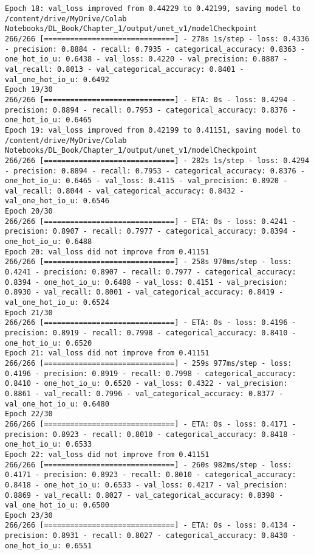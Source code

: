 \documentclass[
  letterpaper,
  DIV=11,
  numbers=noendperiod]{scrreprt}
\begin{document}
\begin{verbatim}
Epoch 18: val_loss improved from 0.44229 to 0.42199, saving model to /content/drive/MyDrive/Colab Notebooks/DL_Book/Chapter_1/output/unet_v1/modelCheckpoint
266/266 [==============================] - 278s 1s/step - loss: 0.4336 - precision: 0.8884 - recall: 0.7935 - categorical_accuracy: 0.8363 - one_hot_io_u: 0.6438 - val_loss: 0.4220 - val_precision: 0.8887 - val_recall: 0.8013 - val_categorical_accuracy: 0.8401 - val_one_hot_io_u: 0.6492
Epoch 19/30
266/266 [==============================] - ETA: 0s - loss: 0.4294 - precision: 0.8894 - recall: 0.7953 - categorical_accuracy: 0.8376 - one_hot_io_u: 0.6465
Epoch 19: val_loss improved from 0.42199 to 0.41151, saving model to /content/drive/MyDrive/Colab Notebooks/DL_Book/Chapter_1/output/unet_v1/modelCheckpoint
266/266 [==============================] - 282s 1s/step - loss: 0.4294 - precision: 0.8894 - recall: 0.7953 - categorical_accuracy: 0.8376 - one_hot_io_u: 0.6465 - val_loss: 0.4115 - val_precision: 0.8920 - val_recall: 0.8044 - val_categorical_accuracy: 0.8432 - val_one_hot_io_u: 0.6546
Epoch 20/30
266/266 [==============================] - ETA: 0s - loss: 0.4241 - precision: 0.8907 - recall: 0.7977 - categorical_accuracy: 0.8394 - one_hot_io_u: 0.6488
Epoch 20: val_loss did not improve from 0.41151
266/266 [==============================] - 258s 970ms/step - loss: 0.4241 - precision: 0.8907 - recall: 0.7977 - categorical_accuracy: 0.8394 - one_hot_io_u: 0.6488 - val_loss: 0.4151 - val_precision: 0.8930 - val_recall: 0.8001 - val_categorical_accuracy: 0.8419 - val_one_hot_io_u: 0.6524
Epoch 21/30
266/266 [==============================] - ETA: 0s - loss: 0.4196 - precision: 0.8919 - recall: 0.7998 - categorical_accuracy: 0.8410 - one_hot_io_u: 0.6520
Epoch 21: val_loss did not improve from 0.41151
266/266 [==============================] - 259s 977ms/step - loss: 0.4196 - precision: 0.8919 - recall: 0.7998 - categorical_accuracy: 0.8410 - one_hot_io_u: 0.6520 - val_loss: 0.4322 - val_precision: 0.8861 - val_recall: 0.7996 - val_categorical_accuracy: 0.8377 - val_one_hot_io_u: 0.6480
Epoch 22/30
266/266 [==============================] - ETA: 0s - loss: 0.4171 - precision: 0.8923 - recall: 0.8010 - categorical_accuracy: 0.8418 - one_hot_io_u: 0.6533
Epoch 22: val_loss did not improve from 0.41151
266/266 [==============================] - 260s 982ms/step - loss: 0.4171 - precision: 0.8923 - recall: 0.8010 - categorical_accuracy: 0.8418 - one_hot_io_u: 0.6533 - val_loss: 0.4217 - val_precision: 0.8869 - val_recall: 0.8027 - val_categorical_accuracy: 0.8398 - val_one_hot_io_u: 0.6500
Epoch 23/30
266/266 [==============================] - ETA: 0s - loss: 0.4134 - precision: 0.8931 - recall: 0.8027 - categorical_accuracy: 0.8430 - one_hot_io_u: 0.6551

\end{verbatim}
\end{document}
